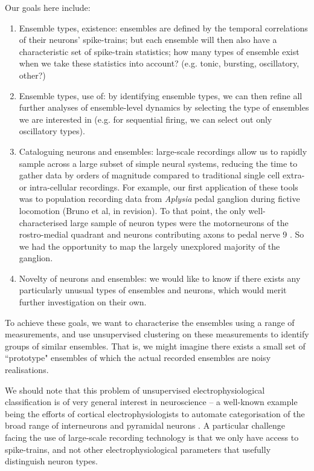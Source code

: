 \documentclass[11pt,a4paper]{article}
\begin{document}
Our goals here include:
\begin{enumerate}

\item Ensemble types, existence: ensembles are defined by the temporal correlations of their neurons' spike-trains; but each ensemble will then also have a characteristic set of spike-train statistics; how many types of ensemble exist when we take these statistics into account? (e.g. tonic, bursting, oscillatory, other?)

\item Ensemble types, use of: by identifying ensemble types, we can then refine all further analyses of ensemble-level dynamics by selecting the type of ensembles we are interested in (e.g. for sequential firing, we can select out only oscillatory types).

\item Cataloguing neurons and ensembles: large-scale recordings allow us to rapidly sample across a large subset of simple neural systems, reducing the time to gather data by orders of magnitude compared to traditional single cell extra- or intra-cellular recordings. For example, our first application of these tools was to population recording data from {\em Aplysia} pedal ganglion during fictive locomotion (Bruno et al, in revision). To that point, the only well-characterised large sample of neuron types were the motorneurons of the rostro-medial quadrant \citep{Hening1979} and neurons contributing axons to pedal nerve 9 \citep{Fredman1980}. So we had the opportunity to map the largely unexplored majority of the ganglion.

\item Novelty of neurons and ensembles: we would like to know if there exists any particularly unusual types of ensembles and neurons, which would merit further investigation on their own.

\end{enumerate}

To achieve these goals, we want to characterise the ensembles using a range of measurements, and use unsupervised clustering on these measurements to identify groups of similar ensembles. That is, we might imagine there exists a small set of ``prototype" ensembles of which the actual recorded ensembles are noisy realisations.

We should note that this problem of unsupervised electrophysiological classification is of very general interest in neuroscience -- a well-known example being the efforts of cortical electrophysiologists to automate categorisation of the broad range of interneurons and pyramidal neurons \citep{Cauli2000,Group2008,Defelipe2013}. A particular challenge facing the use of large-scale recording technology \citep{Bartho2004,Fujisawa2008} is that we only have access to spike-trains, and not other electrophysiological parameters that usefully distinguish neuron types.
\end{document}
